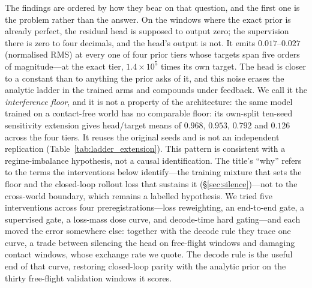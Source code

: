 \documentclass{article}
\begin{document}
The findings are ordered by how they bear on that question, and the first one is the
problem rather than the answer. On the windows where the exact prior is already
perfect, the residual head is supposed to output zero; the supervision there is zero to
four decimals, and the head's output is not. It emits $0.017$--$0.027$ (normalised RMS)
at every one of four prior tiers whose targets span five orders of magnitude---at the
exact tier, $1.4\times10^{5}$ times its own target. The head is closer to a constant
than to anything the prior asks of it, and this noise erases the analytic ladder in the
trained arms and compounds under feedback. We call it the \emph{interference floor},
and it is not a property of the architecture: the same model trained on a contact-free
world has no comparable floor: its own-split ten-seed sensitivity extension gives
head/target means of $0.968$, $0.953$, $0.792$ and $0.126$ across the four tiers. It reuses
the original seeds and is not an independent replication (Table~\ref{tab:ladder_extension}).
This pattern is consistent with a regime-imbalance hypothesis, not a causal identification.
The title's ``why'' refers to the terms the interventions below identify---the training
mixture that sets the floor and the closed-loop rollout loss that sustains it
(\S\ref{sec:silence})---not to the cross-world boundary, which remains a labelled hypothesis.
We tried five interventions across four preregistrations---loss reweighting, an
end-to-end gate, a supervised gate, a loss-mass dose curve, and decode-time hard
gating---and each moved the error somewhere else: together with the decode rule they
trace one curve, a trade between silencing the head on free-flight windows and damaging
contact windows, whose exchange rate we quote. The decode rule is the useful end of
that curve, restoring closed-loop parity with the analytic prior on the thirty
free-flight validation windows it scores.
\end{document}
